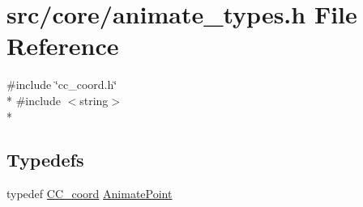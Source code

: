 \hypertarget{a00196}{\section{src/core/animate\-\_\-types.h File Reference}
\label{a00196}
}
{\ttfamily \#include \char`\"{}cc\-\_\-coord.\-h\char`\"{}}\\*
{\ttfamily \#include $<$string$>$}\\*
\subsection*{Typedefs}
\begin{DoxyCompactItemize}
\item 
typedef \hyperlink{a00029}{C\-C\-\_\-coord} \hyperlink{a00196_a91212e6bb797b2b440819b6a9a86f702}{Animate\-Point}
\end{DoxyCompactItemize}
